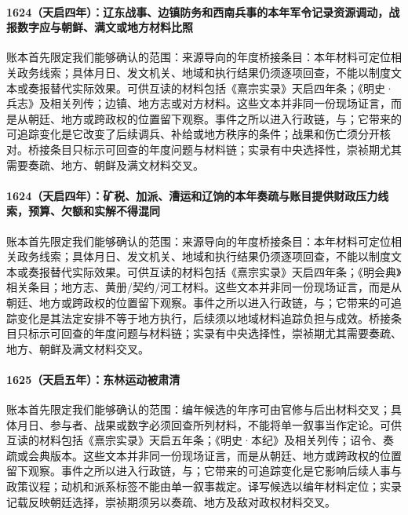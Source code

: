 \paragraph{1624（天启四年）：辽东战事、边镇防务和西南兵事的本年军令记录资源调动，战报数字应与朝鲜、满文或地方材料比照} 账本首先限定我们能够确认的范围：来源导向的年度桥接条目：本年材料可定位相关政务线索；具体月日、发文机关、地域和执行结果仍须逐项回查，不能以制度文本或奏报替代实际效果。可供互读的材料包括《熹宗实录》天启四年条；《明史·兵志》及相关列传；边镇、地方志或对方材料。这些文本并非同一份现场证言，而是从朝廷、地方或跨政权的位置留下观察。事件之所以进入行政链，与；它带来的可追踪变化是它改变了后续调兵、补给或地方秩序的条件；战果和伤亡须分开核对。桥接条目只标示可回查的年度问题与材料链；实录有中央选择性，崇祯期尤其需要奏疏、地方、朝鲜及满文材料交叉。

\paragraph{1624（天启四年）：矿税、加派、漕运和辽饷的本年奏疏与账目提供财政压力线索，预算、欠额和实解不得混同} 账本首先限定我们能够确认的范围：来源导向的年度桥接条目：本年材料可定位相关政务线索；具体月日、发文机关、地域和执行结果仍须逐项回查，不能以制度文本或奏报替代实际效果。可供互读的材料包括《熹宗实录》天启四年条；《明会典》相关条目；地方志、黄册/契约/河工材料。这些文本并非同一份现场证言，而是从朝廷、地方或跨政权的位置留下观察。事件之所以进入行政链，与；它带来的可追踪变化是其法定安排不等于地方执行，后续须以地域材料追踪负担与成效。桥接条目只标示可回查的年度问题与材料链；实录有中央选择性，崇祯期尤其需要奏疏、地方、朝鲜及满文材料交叉。

\paragraph{1625（天启五年）：东林运动被肃清} 账本首先限定我们能够确认的范围：编年候选的年序可由官修与后出材料交叉；具体月日、参与者、战果或数字必须回查所列材料，不能将单一叙事当作定论。可供互读的材料包括《熹宗实录》天启五年条；《明史·本纪》及相关列传；诏令、奏疏或会典版本。这些文本并非同一份现场证言，而是从朝廷、地方或跨政权的位置留下观察。事件之所以进入行政链，与；它带来的可追踪变化是它影响后续人事与政策议程；动机和派系标签不能由单一叙事裁定。译写候选以编年材料定位；实录记载反映朝廷选择，崇祯期须另以奏疏、地方及敌对政权材料交叉。

